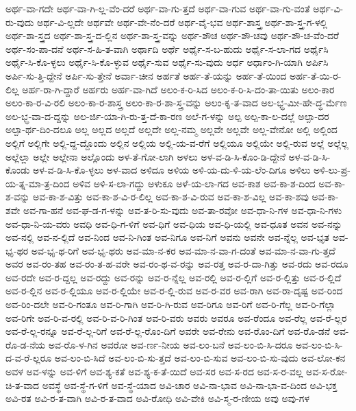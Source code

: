 {ಅರ್ಥ-ವಾ-ಗದೇ
ಅರ್ಥ-ವಾ-ಗಿ-ಲ್ಲ-ವೆಂ-ದರೆ
ಅರ್ಥ-ವಾ-ಗು-ತ್ತದೆ
ಅರ್ಥ-ವಾ-ಗುವ
ಅರ್ಥ-ವಾ-ಗು-ವಂತೆ
ಅರ್ಥ-ವಿ-ರು-ವುದು
ಅರ್ಥ-ವಿ-ಲ್ಲದೇ
ಅರ್ಥವೇ
ಅರ್ಥ-ವೇ-ನೆಂ-ದರೆ
ಅರ್ಥ-ವೈ-ಭವ
ಅರ್ಥ-ಶಾಸ್ತ್ರ
ಅರ್ಥ-ಶಾ-ಸ್ತ್ರ-ಗ-ಳಲ್ಲಿ
ಅರ್ಥ-ಶಾ-ಸ್ತ್ರದ
ಅರ್ಥ-ಶಾ-ಸ್ತ್ರ-ದ-ಲ್ಲಿನ
ಅರ್ಥ-ಶಾ-ಸ್ತ್ರ-ವನ್ನು
ಅರ್ಥ-ಶೌಚ
ಅರ್ಥ-ಶೌ-ಚವು
ಅರ್ಥ-ಶೌ-ಚ-ವೆಂ-ದರೆ
ಅರ್ಥ-ಸಂ-ಪಾ-ದನೆ
ಅರ್ಥ-ಸ-ಹಿ-ತ-ವಾಗಿ
ಅರ್ಥಾದಿ
ಅರ್ಥೆ
ಅರ್ಥೈ-ಸ-ಬ-ಹುದು
ಅರ್ಥೈ-ಸ-ಲಾ-ಗದ
ಅರ್ಥೈಸಿ
ಅರ್ಥೈ-ಸಿ-ಕೊ-ಳ್ಳಲು
ಅರ್ಥೈ-ಸಿ-ಕೊ-ಳ್ಳುವ
ಅರ್ಥೈ-ಸುವ
ಅರ್ಥೈ-ಸು-ವುದು
ಅರ್ಧ
ಅರ್ಧಾಂ-ಗಿ-ಯಾಗಿ
ಅರ್ಪಿಸಿ
ಅರ್ಪಿ-ಸು-ತ್ತಿ-ದ್ದೇನೆ
ಅರ್ಪಿ-ಸು-ತ್ತೇನೆ
ಅರ್ವಾ-ಚೀನ
ಅರ್ಹತೆ
ಅರ್ಹ-ತೆ-ಯನ್ನು
ಅರ್ಹ-ತೆ-ಯಿಂದ
ಅರ್ಹ-ತೆ-ಯಿ-ರ-ಲಿಲ್ಲ
ಅರ್ಹ-ರಾ-ಗಿ-ದ್ದಾರೆ
ಅರ್ಹರು
ಅರ್ಹ-ವಾ-ಗಿದೆ
ಅಲಂ-ಕ-ರಿ-ಸಿದ
ಅಲಂ-ಕ-ರಿ-ಸಿ-ದಂ-ತಾ-ಯಿತು
ಅಲಂ-ಕಾರ
ಅಲಂ-ಕಾ-ರ-ವಿ-ರಲಿ
ಅಲಂ-ಕಾ-ರ-ಶಾಸ್ತ್ರ
ಅಲಂ-ಕಾ-ರ-ಶಾ-ಸ್ತ್ರ-ವನ್ನು
ಅಲಂ-ಕೃ-ತ-ವಾದ
ಅಲ-ಭ್ಧ-ಮೀ-ಹೇ-ದ್ಧ-ರ್ಮೆಣ
ಅಲ-ಭ್ಧ-ವಾ-ದ-ದ್ದನ್ನು
ಅಲ-ರ್ಜಿ-ಯಾ-ಗಿ-ರು-ತ್ತ-ದೆ-ಕಾ-ರಣ
ಅಲೆ-ಗ-ಳನ್ನು
ಅಲ್ಪ
ಅಲ್ಪ-ಕಾ-ಲ-ದಲ್ಲೆ
ಅಲ್ಪಾ-ದರ
ಅಲ್ಪಾ-ರ್ಥ-ದಿಂ-ದಲೂ
ಅಲ್ಲ
ಅಲ್ಲದ
ಅಲ್ಲದೆ
ಅಲ್ಲದೇ
ಅಲ್ಲ-ನಮ್ಮ
ಅಲ್ಲವೇ
ಅಲ್ಲವೇ
ಅಲ್ಲ-ವೇನೋ
ಅಲ್ಲಿ
ಅಲ್ಲಿಂದ
ಅಲ್ಲಿಗೆ
ಅಲ್ಲಿಗೇ
ಅಲ್ಲಿ-ದ್ದ-ದ್ದೊಂದು
ಅಲ್ಲಿನ
ಅಲ್ಲಿಯ
ಅಲ್ಲಿ-ಯ-ವ-ರೆಗೆ
ಅಲ್ಲಿಯೂ
ಅಲ್ಲಿಯೇ
ಅಲ್ಲಿ-ರುವ
ಅಲ್ಲೆ
ಅಲ್ಲೆಲ್ಲ
ಅಲ್ಲೆಲ್ಲಾ
ಅಲ್ಲೇ
ಅಲ್ಲೇನಾ
ಅಲ್ಲೊಂದು
ಅಳ-ತೆ-ಗೋ-ಲಾಗಿ
ಅಳಲು
ಅಳ-ವ-ಡಿ-ಸಿ-ಕೊಂ-ಡಿ-ದ್ದೇನೆ
ಅಳ-ವ-ಡಿ-ಸಿ-ಕೊಂಡು
ಅಳ-ವ-ಡಿ-ಸಿ-ಕೊ-ಳ್ಳಲು
ಅಳ-ವಾದ
ಅಳಿದೂ
ಅಳಿಯ
ಅಳಿ-ಯ-ದು-ಳಿ-ಯ-ಲೆಂ-ದಿಗೂ
ಅಳಿಲು
ಅಳಿ-ಲು-ಪ್ರ-ಯ-ತ್ನ-ಮಾ-ತ್ರ-ದಿಂದ
ಅಳಿವ
ಅಳಿ-ಸ-ಲಾ-ಗದ್ದು
ಅಳುಕೂ
ಅಳೆ-ಯ-ಲಾ-ಗದ
ಅವ-ಕಾಶ
ಅವ-ಕಾ-ಶ-ದಿಂದ
ಅವ-ಕಾ-ಶ-ವನ್ನು
ಅವ-ಕಾ-ಶ-ವಿತ್ತು
ಅವ-ಕಾ-ಶ-ವಿ-ರ-ಲಿಲ್ಲ
ಅವ-ಕಾ-ಶ-ವಿ-ರುವ
ಅವ-ಕಾ-ಶ-ವಿಲ್ಲ
ಅವ-ಕಾ-ಶವು
ಅವ-ಕಾ-ಶವೇ
ಅವ-ಗಾ-ಹನೆ
ಅವ-ಘ-ಡ-ಗ-ಳನ್ನು
ಅವ-ತ-ರಿ-ಸು-ವುದು
ಅವ-ತಾ-ರವೋ
ಅವ-ಧಾ-ನಿ-ಗಳ
ಅವ-ಧಾ-ನಿ-ಗಳು
ಅವ-ಧಾ-ನಿ-ಯ-ವರು
ಅವಧಿ
ಅವ-ಧಿ-ಗ-ಳಿಗೆ
ಅವ-ಧಿಗೆ
ಅವ-ಧಿಯ
ಅವ-ಧಿ-ಯಲ್ಲಿ
ಅವ-ಧೂತ
ಅವನ
ಅವ-ನನ್ನು
ಅವ-ನಲ್ಲಿ
ಅವ-ನ-ಲ್ಲಿದೆ
ಅವ-ನಿಂದ
ಅವ-ನಿ-ಗಿಂತ
ಅವ-ನಿಗೂ
ಅವ-ನಿಗೆ
ಅವನು
ಅವನೇ
ಅವ-ನ್ನೆಲ್ಲ
ಅವ-ಭೃತ
ಅವ-ಭೃ-ಥರ
ಅವ-ಭೃ-ಥ-ರಿಗೆ
ಅವ-ಭೃ-ಥರು
ಅವ-ಮಾ-ನ-ಕರ
ಅವ-ಮಾ-ನ-ವಾ-ಗ-ದಂತೆ
ಅವ-ಮಾ-ನ-ವಾ-ಗು-ತ್ತದೆ
ಅವರ
ಅವ-ರಂ-ತಹ
ಅವ-ರಂ-ತ-ಹ-ವರೇ
ಅವ-ರಂ-ಥ-ವ-ರನ್ನು
ಅವ-ರತ್ತ
ಅವ-ರ-ದಾ-ಗಿತ್ತು
ಅವ-ರದು
ಅವ-ರದೂ
ಅವ-ರದೇ
ಅವ-ರ-ದ್ದಲ್ಲ
ಅವ-ರದ್ದು
ಅವ-ರನ್ನು
ಅವ-ರ-ನ್ನೆಲ್ಲ
ಅವ-ರಲ್ಲಿ
ಅವ-ರ-ಲ್ಲಿಗೆ
ಅವ-ರ-ಲ್ಲಿತ್ತು
ಅವ-ರ-ಲ್ಲಿದೆ
ಅವ-ರ-ಲ್ಲಿನ
ಅವ-ರ-ಲ್ಲಿಯೂ
ಅವ-ರ-ಲ್ಲಿಯೇ
ಅವ-ರ-ಲ್ಲಿ-ರುವ
ಅವ-ರ-ವರ
ಅವ-ರಾಗಿ
ಅವ-ರಾ-ದೃಷ್ಟ
ಅವ-ರಿಂದ
ಅವ-ರಿಂ-ದಲೇ
ಅವ-ರಿ-ಗಂತೂ
ಅವ-ರಿ-ಗಾಗಿ
ಅವ-ರಿ-ಗಿ-ರುವ
ಅವ-ರಿಗೂ
ಅವ-ರಿಗೆ
ಅವ-ರಿ-ಗೆಲ್ಲ
ಅವ-ರಿ-ಗೆಲ್ಲಾ
ಅವ-ರಿಗೇ
ಅವ-ರಿ-ವ-ರಲ್ಲಿ
ಅವ-ರಿ-ವ-ರಿ-ಗಿಂತ
ಅವ-ರಿ-ವರು
ಅವರು
ಅವರೂ
ಅವ-ರೆಂದೂ
ಅವ-ರೆಲ್ಲ
ಅವ-ರೆ-ಲ್ಲರ
ಅವ-ರೆ-ಲ್ಲ-ರನ್ನೂ
ಅವ-ರೆ-ಲ್ಲ-ರಿಗೆ
ಅವ-ರೆ-ಲ್ಲ-ರೊಂ-ದಿಗೆ
ಅವರೇ
ಅವ-ರೇನು
ಅವ-ರೊಂ-ದಿಗೆ
ಅವ-ರೊ-ಡನೆ
ಅವ-ರೊ-ಡ-ನೆಯ
ಅವ-ರೊ-ಳ-ಗಿನ
ಅವರೋ
ಅವ-ರ್ಣ-ನೀಯ
ಅವ-ಲಂ-ಬನೆ
ಅವ-ಲಂ-ಬಿ-ಸಿ-ದರೂ
ಅವ-ಲಂ-ಬಿ-ಸಿ-ದ-ವ-ರೆ-ಲ್ಲರೂ
ಅವ-ಲಂ-ಬಿ-ಸಿದೆ
ಅವ-ಲಂ-ಬಿ-ಸು-ತ್ತದೆ
ಅವ-ಲಂ-ಬಿ-ಸುವ
ಅವ-ಲಂ-ಬಿ-ಸು-ವುದು
ಅವ-ಲೋ-ಕನ
ಅವಳ
ಅವ-ಳನ್ನು
ಅವ-ಳಿಗೆ
ಅವ-ಶ್ಯ-ಕತೆ
ಅವ-ಶ್ಯ-ಕ-ತೆ-ಯಿದೆ
ಅವ-ಸರ
ಅವ-ಸ-ರದ
ಅವ-ಸ-ರ-ವಲ್ಲ
ಅವ-ಸ-ರೋ-ಚಿ-ತ-ವಾದ
ಅವಸ್ಥೆ
ಅವ-ಸ್ಥೆ-ಗ-ಳಿಗೆ
ಅವ-ಸ್ಥೆ-ಯಾದ
ಅವಿ-ಚಾರ
ಅವಿ-ನಾ-ಭಾವ
ಅವಿ-ನಾ-ಭಾ-ವ-ದಿಂದ
ಅವಿ-ಭಕ್ತ
ಅವಿ-ರತ
ಅವಿ-ರ-ತ-ವಾಗಿ
ಅವಿ-ರ-ತ-ವಾದ
ಅವಿ-ರೋಧಿ
ಅವಿ-ವೇಕಿ
ಅವಿ-ಸ್ಮ-ರ-ಣೀಯ
ಅವು
ಅವು-ಗಳ
}
